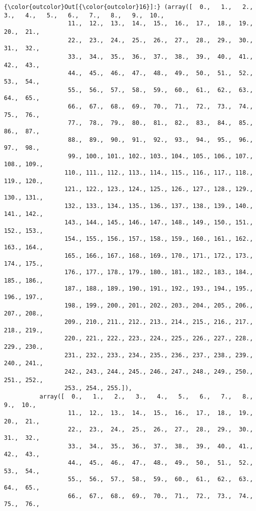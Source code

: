 \documentclass[11pt]{article}
\begin{document}
\begin{Verbatim}[commandchars=\\\{\}]
{\color{outcolor}Out[{\color{outcolor}16}]:} (array([  0.,   1.,   2.,   3.,   4.,   5.,   6.,   7.,   8.,   9.,  10.,
                  11.,  12.,  13.,  14.,  15.,  16.,  17.,  18.,  19.,  20.,  21.,
                  22.,  23.,  24.,  25.,  26.,  27.,  28.,  29.,  30.,  31.,  32.,
                  33.,  34.,  35.,  36.,  37.,  38.,  39.,  40.,  41.,  42.,  43.,
                  44.,  45.,  46.,  47.,  48.,  49.,  50.,  51.,  52.,  53.,  54.,
                  55.,  56.,  57.,  58.,  59.,  60.,  61.,  62.,  63.,  64.,  65.,
                  66.,  67.,  68.,  69.,  70.,  71.,  72.,  73.,  74.,  75.,  76.,
                  77.,  78.,  79.,  80.,  81.,  82.,  83.,  84.,  85.,  86.,  87.,
                  88.,  89.,  90.,  91.,  92.,  93.,  94.,  95.,  96.,  97.,  98.,
                  99., 100., 101., 102., 103., 104., 105., 106., 107., 108., 109.,
                 110., 111., 112., 113., 114., 115., 116., 117., 118., 119., 120.,
                 121., 122., 123., 124., 125., 126., 127., 128., 129., 130., 131.,
                 132., 133., 134., 135., 136., 137., 138., 139., 140., 141., 142.,
                 143., 144., 145., 146., 147., 148., 149., 150., 151., 152., 153.,
                 154., 155., 156., 157., 158., 159., 160., 161., 162., 163., 164.,
                 165., 166., 167., 168., 169., 170., 171., 172., 173., 174., 175.,
                 176., 177., 178., 179., 180., 181., 182., 183., 184., 185., 186.,
                 187., 188., 189., 190., 191., 192., 193., 194., 195., 196., 197.,
                 198., 199., 200., 201., 202., 203., 204., 205., 206., 207., 208.,
                 209., 210., 211., 212., 213., 214., 215., 216., 217., 218., 219.,
                 220., 221., 222., 223., 224., 225., 226., 227., 228., 229., 230.,
                 231., 232., 233., 234., 235., 236., 237., 238., 239., 240., 241.,
                 242., 243., 244., 245., 246., 247., 248., 249., 250., 251., 252.,
                 253., 254., 255.]),
          array([  0.,   1.,   2.,   3.,   4.,   5.,   6.,   7.,   8.,   9.,  10.,
                  11.,  12.,  13.,  14.,  15.,  16.,  17.,  18.,  19.,  20.,  21.,
                  22.,  23.,  24.,  25.,  26.,  27.,  28.,  29.,  30.,  31.,  32.,
                  33.,  34.,  35.,  36.,  37.,  38.,  39.,  40.,  41.,  42.,  43.,
                  44.,  45.,  46.,  47.,  48.,  49.,  50.,  51.,  52.,  53.,  54.,
                  55.,  56.,  57.,  58.,  59.,  60.,  61.,  62.,  63.,  64.,  65.,
                  66.,  67.,  68.,  69.,  70.,  71.,  72.,  73.,  74.,  75.,  76.,

\end{Verbatim}
\end{document}
